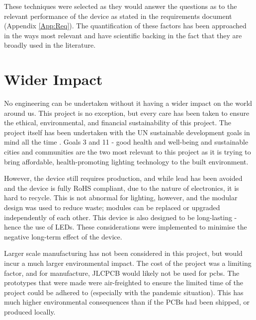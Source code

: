 These techniques were selected as they would answer the questions as to the relevant performance of the device as stated in the requirements document (Appendix \ref{App:Req}). The quantification of these factors has been approached in the ways most relevant and have scientific backing in the fact that they are broadly used in the literature.

\section{Wider Impact}

No engineering can be undertaken without it having a wider impact on the world around us. This project is no exception, but every care has been taken to ensure the ethical, environmental, and financial sustainability of this project. The project itself has been undertaken with the UN sustainable development goals in mind all the time \citep{unResolutionAdoptedGeneral2015}. Goals 3 and 11 - good health and well-being and sustainable cities and communities are the two most relevant to this project as it is trying to bring affordable, health-promoting lighting technology to the built environment.

However, the device still requires production, and while lead has been avoided and the device is fully RoHS compliant, due to the nature of electronics, it is hard to recycle. This is not abnormal for lighting, however, and the modular design was used to reduce waste; modules can be replaced or upgraded independently of each other. This device is also designed to be long-lasting - hence the use of LEDs. These considerations were implemented to minimise the negative long-term effect of the device.

Larger scale manufacturing has not been considered in this project, but would incur a much larger environmental impact. The cost of the project was a limiting factor, and for manufacture, JLCPCB would likely not be used for \acrshort{pcbs}. The prototypes that were made were air-freighted to ensure the limited time of the project could be adhered to (especially with the pandemic situation). This has much higher environmental consequences than if the PCBs had been shipped, or produced locally.
